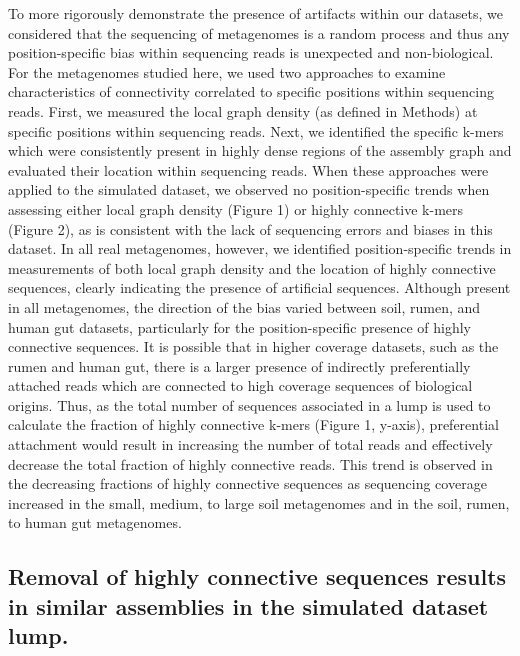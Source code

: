 \documentclass[11pt]{article} %
\begin{document}
To more rigorously demonstrate the presence of artifacts within our datasets, we considered that the sequencing of metagenomes is a random process and thus any position-specific bias within sequencing reads is unexpected and non-biological.   For the metagenomes studied here, we used two approaches to examine characteristics of connectivity correlated to specific positions within sequencing reads.  First, we measured the local graph density (as defined in Methods) at specific positions within sequencing reads.  Next, we identified the specific k-mers which were consistently present in highly dense regions of the assembly graph and evaluated their location within sequencing reads.  When these approaches were applied to the simulated dataset, we observed no position-specific trends when assessing either local graph density (Figure 1) or highly connective k-mers (Figure 2), as is consistent with the lack of sequencing errors and biases in this dataset.  In all real metagenomes, however, we identified position-specific trends in measurements of both local graph density and the location of highly connective sequences, clearly indicating the presence of artificial sequences.  Although present in all metagenomes, the direction of the bias varied between soil, rumen, and human gut datasets, particularly for the position-specific presence of highly connective sequences.  It is possible that in higher coverage datasets, such as the rumen and human gut, there is a larger presence of indirectly preferentially attached reads which are connected to high coverage sequences of biological origins.  Thus, as the total number of sequences associated in a lump is used to calculate the fraction of highly connective k-mers (Figure 1, y-axis), preferential attachment would result in increasing the number of total reads and effectively decrease the total fraction of highly connective reads.  This trend is observed in the decreasing fractions of highly connective sequences as sequencing coverage increased in the small, medium, to large soil metagenomes and in the soil, rumen, to human gut metagenomes.

\subsection{Removal of highly connective sequences results in similar assemblies in the simulated dataset lump.}
\end{document}
